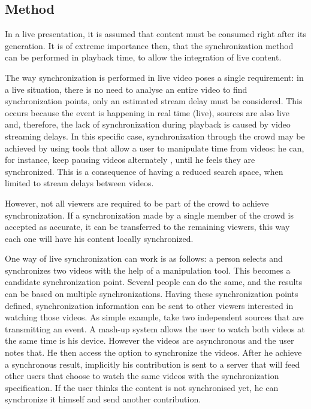 \documentclass{sig-alternate-05-2015}
\begin{document}
\subsection{Method}
In a live presentation, it is assumed that content must be consumed right after its generation. It is of extreme importance then, that the synchronization method can be performed in playback time, to allow the integration of live content.

The way synchronization is performed in live video poses a single requirement: in a live situation, there is no need to analyse an entire video to find synchronization points, only an estimated stream delay must be considered. This occurs because the event is happening in real time (live), sources are also live and, therefore, the lack of synchronization during playback is caused by video streaming delays. In this specific case, synchronization through the crowd may be achieved by using tools that allow a user to manipulate time from videos: he can, for instance, keep pausing videos alternately , until he feels they are synchronized. This is a consequence of having a reduced search space, when limited to stream delays between videos.

However, not all viewers are required to be part of the crowd to achieve synchronization. If a synchronization made by a single member of the crowd is accepted as accurate, it can be transferred to the remaining viewers, this way each one will have his content locally synchronized.

One way of live synchronization can work is as follows: a person selects and synchronizes two videos with the help of a manipulation tool. This becomes a candidate synchronization point. Several people can do the same, and the results can be based on multiple synchronizations. Having these synchronization points defined, synchronization information can be sent to other viewers interested in watching those videos. As simple example, take two independent sources that are transmitting an event. A mash-up system allows the user to watch both videos at the same time is his device. However the videos are asynchronous and the user notes that. He then access the option to synchronize the videos. After he achieve a synchronous result, implicitly his contribution is sent to a server that will feed other users that choose to watch the same videos with the synchronization specification. If the user thinks the content is not synchronised yet, he can synchronize it himself and send another contribution.
\end{document}
